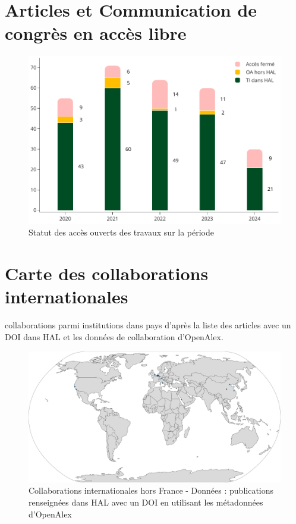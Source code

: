 \documentclass[french, 11pt]{../../dibiso/biso}
\begin{document}
\pagebreak

\section{Articles et Communication de congrès en accès libre} %

\begin{figure}[!h]
  \includegraphics[width=\textwidth]{figures/open_access_works.pdf}
  \caption{Statut des accès ouverts des travaux sur la période \oaworksperiod}
  \label{fig_open_access_works}
\end{figure}


\pagebreak

\section{Carte des collaborations internationales}

{\collaborationsnb} collaborations parmi {\institutionsnb} institutions dans {\countriesnb} pays d'après la liste des articles avec un DOI dans HAL et les données de collaboration d'OpenAlex.

\begin{figure}[!h]
  \hspace{-.1\textwidth}\includegraphics[width=1.2\textwidth]{figures/collaborations_map.pdf}
  \caption{Collaborations internationales hors France - Données : publications renseignées dans HAL avec un DOI en utilisant les métadonnées d'OpenAlex}
  \label{fig_collab_map}
\end{figure}
\end{document}
